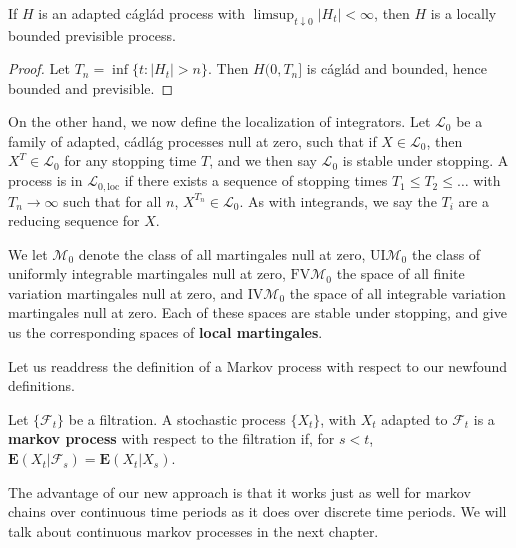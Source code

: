 \begin{lemma}
    If $H$ is an adapted c\'{a}gl\'{a}d process with $\limsup_{t \downarrow 0} |H_t| < \infty$, then $H$ is a locally bounded previsible process.
\end{lemma}
\begin{proof}
    Let $T_n = \inf \{ t: |H_t| > n \}$. Then $H(0,T_n]$ is c\'{a}gl\'{a}d and bounded, hence bounded and previsible.
\end{proof}

On the other hand, we now define the localization of integrators. Let $\mathcal{L}_0$ be a family of adapted, c\'{a}dl\'{a}g processes null at zero, such that if $X \in \mathcal{L}_0$, then $X^T \in \mathcal{L}_0$ for any stopping time $T$, and we then say $\mathcal{L}_0$ is stable under stopping. A process is in $\mathcal{L}_{0,\text{loc}}$ if there exists a sequence of stopping times $T_1 \leq T_2 \leq \dots$ with $T_n \to \infty$ such that for all $n$, $X^{T_n} \in \mathcal{L}_0$. As with integrands, we say the $T_i$ are a reducing sequence for $X$.

\begin{example}
    We let $\mathcal{M}_0$ denote the class of all martingales null at zero, $\text{UI} \mathcal{M}_0$ the class of uniformly integrable martingales null at zero, $\text{FV} \mathcal{M}_0$ the space of all finite variation martingales null at zero, and $\text{IV} \mathcal{M}_0$ the space of all integrable variation martingales null at zero. Each of these spaces are stable under stopping, and give us the corresponding spaces of {\bf local martingales}.
\end{example}




Let us readdress the definition of a Markov process with respect to our newfound definitions.

\begin{definition}
    Let $\{ \mathcal{F}_t \}$ be a filtration. A stochastic process $\{ X_t \}$, with $X_t$ adapted to $\mathcal{F}_t$ is a {\bf markov process} with respect to the filtration if, for $s < t$, $\mathbf{E}(X_t | \mathcal{F}_s) = \mathbf{E}(X_t | X_s)$.
\end{definition}

The advantage of our new approach is that it works just as well for markov chains over continuous time periods as it does over discrete time periods. We will talk about continuous markov processes in the next chapter.
